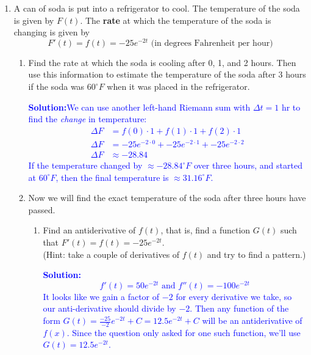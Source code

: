 \documentclass[letterpaper,11pt]{article}
\def\ds{\displaystyle}
\newcommand{\sol}[2]{\begin{minipage}[c][#1]{\linewidth}{\textcolor{blue}{\textbf{Solution:}}\quad \textcolor{blue}{#2}}\end{minipage}}
\newcommand{\sol}[2]{\begin{minipage}[c][#1]{\linewidth}{\vfill}\end{minipage}}
\begin{document}
\begin{enumerate}
\sol{1.8 in}{
\[\ds \sum_{i=1}^n r(a+i\Delta t)\cdot \Delta t \quad \text{where, in this case, $a=0$ and $\Delta t=2$}\]
\vspace{-.2in}
\begin{align*}
&=r(0)\cdot 2 + r(2)\cdot 2 + r(4)\cdot 2 + r(6)\cdot 2 + r(8)\cdot 2 + r(10)\cdot 2\\
&=2\left(r(0)+r(2)+r(4)+r(6)+r(8)+r(10)\right)\\
&=2\left(154+17+10+79+278-432\right)\\
&=212
\end{align*}
}
\vspace{-.3 in}
\item A can of soda is put into a refrigerator to cool.  The temperature of the soda is given by $F(t)$. The {\bf rate} at which the temperature of the soda is changing is given by
\[F'(t) = f(t) = -25e^{-2t} \text{ (in degrees Fahrenheit per hour)}\]
\begin{enumerate}
\item  Find the rate at which the soda is cooling after 0, 1, and 2 hours.  Then use this information to estimate the temperature of the soda after 3 hours if the soda was $60^\circ F$ when it was placed in the refrigerator.

\sol{1.75 in}{We can use another left-hand Riemann sum with $\Delta t=1$ hr to find the \emph{change} in temperature:
\begin{align*}
\Delta F&=f(0) \cdot 1 + f(1) \cdot 1+f(2) \cdot 1\\
\Delta F&=-25e^{-2\cdot 0}+-25e^{-2\cdot 1}+-25e^{-2\cdot 2}\\
\Delta F&\approx -28.84
\end{align*} 
If the temperature changed by $\approx -28.84^\circ F$ over three hours, and started at $60^\circ F$, then the final temperature is $\approx 31.16^\circ F$. 
}
\newpage
\item  Now we will find the exact temperature of the soda after three hours have passed. 
\begin{enumerate}
\item Find an antiderivative of $f(t)$, that is, find a function $G(t)$ such that $F'(t)=f(t)=-25e^{-2t}$. \\(Hint: take a couple of derivatives of $f(t)$ and try to find a pattern.)

\sol{2 in}{
\[f'(t)=50e^{-2t} \text{ and } f''(t)=-100e^{-2t}\]
It looks like we gain a factor of $-2$ for every derivative we take, so our anti-derivative should divide by $-2$. Then any function of the form $\ds G(t)=\frac{-25}{-2}e^{-2t}+C=12.5e^{-2t}+C$ will be an antiderivative of $f(x)$. Since the question only asked for one such function, we'll use $G(t)=12.5e^{-2t}$.}


\end{enumerate}
\end{enumerate}
\end{enumerate}
\end{document}
